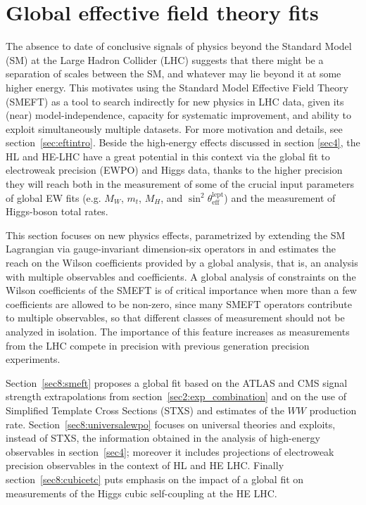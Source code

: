 \documentclass[../report.tex]{subfiles}
\begin{document}
\section{Global effective field theory fits \label{sec8:globalfit}}
\label{sec8}

The absence to date of conclusive signals of physics beyond the Standard Model (SM) at the Large Hadron Collider (LHC) suggests
that there might be a separation of scales between the SM, and whatever may lie beyond it at some higher energy.
This motivates using the Standard Model Effective Field Theory (SMEFT) as a tool to search indirectly for new physics in LHC data,
given its (near) model-independence, capacity for systematic improvement, and ability to exploit simultaneously multiple datasets. For more motivation and details, see section~\ref{sec:eftintro}.
Beside the high-energy effects discussed in section \ref{sec4}, the HL and HE-LHC have a great potential in this context via the global fit to electroweak precision (EWPO) and Higgs
data, thanks to the higher precision they will reach both in the
measurement of some of the crucial input parameters of global EW fits
(e.g. $M_W$, $m_t$, $M_H$, and
$\sin^2\theta_{\mathrm{eff}}^{\mathrm{lept}}$) and the measurement
of Higgs-boson total rates.




This section focuses  on new physics effects, parametrized by extending
the SM Lagrangian via gauge-invariant dimension-six operators in  and estimates the reach on the Wilson coefficients provided by a global analysis, that is, an analysis with multiple observables and coefficients.
A global analysis of constraints on the Wilson coefficients of the SMEFT is of critical importance when more than a few coefficients are allowed to be non-zero,
since many SMEFT operators contribute to multiple observables, so that different classes of measurement should not be analyzed in isolation.
The importance of this feature increases as
measurements from the LHC compete in precision with previous generation precision experiments.

Section~\ref{sec8:smeft} proposes a global fit  based on the ATLAS and CMS signal strength extrapolations from section~\ref{sec2:exp_combination} and on the use of Simplified Template Cross Sections (STXS) and estimates of the $WW$ production rate. Section~\ref{sec8:universalewpo} focuses on universal theories and exploits, instead of STXS, the information obtained in the analysis of high-energy observables in section~\ref{sec4}; moreover it includes projections of electroweak precision observables in the context of HL and HE LHC. Finally section~\ref{sec8:cubicetc} puts emphasis on the impact of a global fit on measurements of the Higgs cubic self-coupling at the HE LHC.
\end{document}

